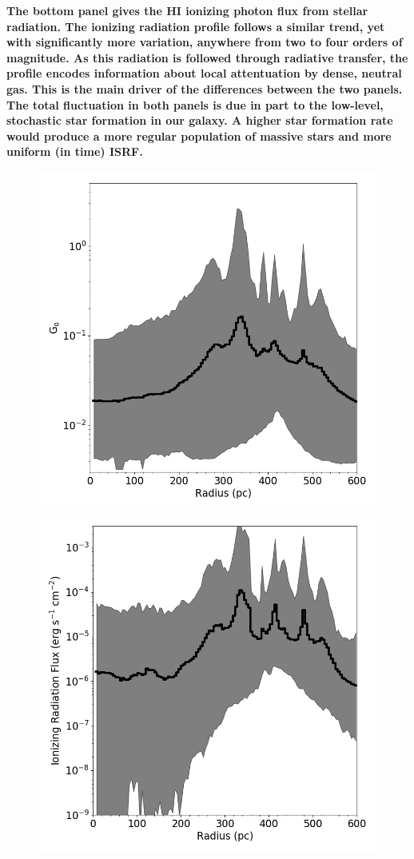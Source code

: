 \documentclass[fleqn,usenatbib,useAMS]{mnras}
\begin{document}
\textbf{ The bottom panel gives the HI ionizing photon flux from stellar radiation. The ionizing radiation profile follows a similar trend, yet with significantly more variation, anywhere from two to four orders of magnitude. As this radiation is followed through radiative transfer, the profile encodes information about local attentuation by dense, neutral gas. This is the main driver of the differences between the two panels. The total fluctuation in both panels is due in part to the low-level, stochastic star formation in our galaxy. A higher star formation rate would produce a more regular population of massive stars and more uniform (in time) ISRF.}

\begin{figure}
\includegraphics[width=0.95\linewidth]{G_o_profile} \\
\includegraphics[width=0.95\linewidth]{ionizing_photon_profile}

\end{figure}
\end{document}

